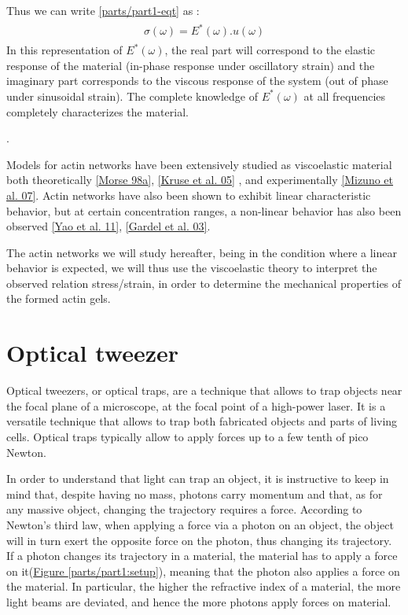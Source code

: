 \documentclass[A4paperpaper,11pt,english]{sphinxmanual}
\begin{document}
Thus we can write \eqref{parts/part1-eqt} as :
\label{parts/part1:equation-eqa17}\begin{gather}
\begin{split}\sigma(\omega) = E^*(\omega).u(\omega)\end{split}\label{parts/part1-eqa17}
\end{gather}
In this representation of \(E^*(\omega)\), the real part will correspond to
the elastic response of the material (in-phase response
under oscillatory strain) and the imaginary part corresponds to the viscous response
of the system (out of phase under sinusoidal strain). The complete knowledge of
\(E^*(\omega)\) at all frequencies completely characterizes the material.

.

Models for actin networks have been extensively studied as viscoelastic material
both theoretically {\hyperref[parts/part1:morse1998a]{{[}Morse 98a{]}}}, {\hyperref[parts/part1:kruse2005]{{[}Kruse et al. 05{]}}} , and  experimentally
{\hyperref[parts/part1:mizuno2007]{{[}Mizuno et al. 07{]}}}. Actin networks have also been shown to exhibit linear characteristic behavior,
but at certain concentration ranges, a non-linear behavior has also been observed {\hyperref[parts/part1:yao2011]{{[}Yao et al. 11{]}}}, {\hyperref[parts/part1:gardel2003]{{[}Gardel et al. 03{]}}}.

The actin networks we will study hereafter, being in the condition where a linear behavior is expected, we will thus use the viscoelastic theory to interpret the
observed relation stress/strain, in order to determine the mechanical properties
of the formed actin gels.


\section{Optical tweezer}
\label{parts/part1:optical-tweezer}\label{parts/part1:id77}
Optical tweezers, or optical traps, are a technique that allows to trap objects
near the focal plane of a microscope, at the focal point of a high-power laser.
It is a versatile technique that allows to trap both fabricated objects and
parts of living cells. Optical traps typically allow to apply forces up to a few tenth of
pico Newton.

In order to understand that light can trap an object, it is instructive to keep in mind
that, despite having no mass, photons carry momentum and that, as for any massive
object, changing the trajectory requires a force.  According to Newton's third
law, when applying a force via a photon on an object, the object will in turn
exert the opposite force on the photon, thus changing its trajectory. If a photon changes its trajectory in a material, the material has to apply a
force on it(\hyperref[parts/part1:setup]{Figure  \ref*{parts/part1:setup}}), meaning that the photon also applies a force on the
material. In particular, the higher the refractive index of a material, the
more light beams are deviated, and hence the more photons apply forces on
material.
\end{document}

